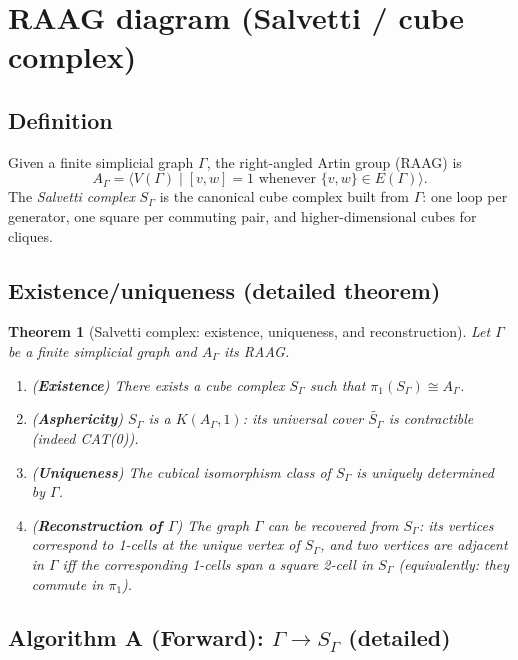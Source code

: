 \documentclass[11pt]{article}
\newtheorem{theorem}{Theorem}[section]
\theoremstyle{definition}
\theoremstyle{plain}
\theoremstyle{remark}
\begin{document}
\section{RAAG diagram (Salvetti / cube complex)}

\subsection*{Definition}
Given a finite simplicial graph $\Gamma$, the right-angled Artin group (RAAG) is
\[
A_\Gamma=\langle V(\Gamma)\mid [v,w]=1 \text{ whenever }\{v,w\}\in E(\Gamma)\rangle.
\]
The \emph{Salvetti complex} $S_\Gamma$ is the canonical cube complex built from $\Gamma$:
one loop per generator, one square per commuting pair, and higher-dimensional cubes for cliques.

\subsection*{Existence/uniqueness (detailed theorem)}
\begin{theorem}[Salvetti complex: existence, uniqueness, and reconstruction]\label{thm:salvetti}
Let $\Gamma$ be a finite simplicial graph and $A_\Gamma$ its RAAG.
\begin{enumerate}[leftmargin=2.2em]
\item (\textbf{Existence}) There exists a cube complex $S_\Gamma$ such that $\pi_1(S_\Gamma)\cong A_\Gamma$.
\item (\textbf{Asphericity}) $S_\Gamma$ is a $K(A_\Gamma,1)$: its universal cover $\widetilde{S_\Gamma}$ is contractible (indeed CAT(0)).
\item (\textbf{Uniqueness}) The cubical isomorphism class of $S_\Gamma$ is uniquely determined by $\Gamma$.
\item (\textbf{Reconstruction of $\Gamma$}) The graph $\Gamma$ can be recovered from $S_\Gamma$:
its vertices correspond to 1-cells at the unique vertex of $S_\Gamma$, and two vertices are adjacent in $\Gamma$
iff the corresponding 1-cells span a square 2-cell in $S_\Gamma$ (equivalently: they commute in $\pi_1$).
\end{enumerate}
\end{theorem}

\subsection*{Algorithm A (Forward): $\Gamma\to S_\Gamma$ (detailed)}\cite{green1990,salvetti1987,charney2007,bridsonhaefliger1999,gromov1987}
\end{document}
